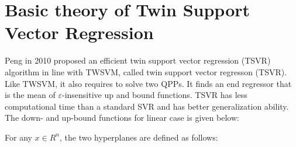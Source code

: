 \documentclass[pdflatex,sn-mathphys]{sn-jnl}%
\theoremstyle{thmstyleone}%
\theoremstyle{thmstyletwo}%
\theoremstyle{thmstylethree}%
\begin{document}
\section{Basic theory of Twin Support Vector Regression}
\label{sec:Basic theory of Twin Support Vector Regression}



Peng \cite{peng2010tsvr} in 2010 proposed an efficient twin support vector regression (TSVR) algorithm in line with TWSVM, called twin support vector regresson (TSVR). Like TWSVM, it also requires to solve two QPPs. It finds an end regressor that is the mean of $\varepsilon$-insensitive up and bound functions. TSVR has less computational time than a standard SVR and has better generalization ability. The down- and up-bound functions for linear case is given below:

For any $x\in R^{n}$, the two hyperplanes are defined as follows:
\end{document}
